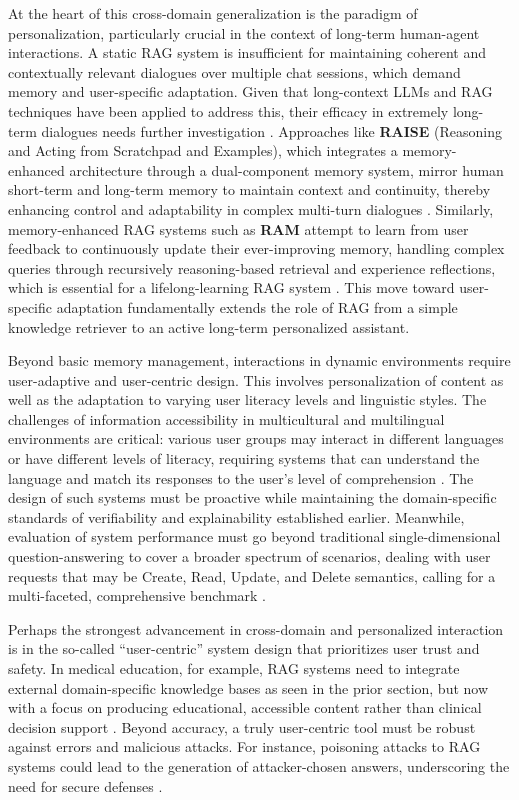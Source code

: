 \documentclass[11pt]{article}
\begin{document}
At the heart of this cross-domain generalization is the paradigm of personalization, particularly crucial in the context of long-term human-agent interactions. A static RAG system is insufficient for maintaining coherent and contextually relevant dialogues over multiple chat sessions, which demand memory and user-specific adaptation. Given that long-context LLMs and RAG techniques have been applied to address this, their efficacy in extremely long-term dialogues needs further investigation \cite{ref395}. Approaches like \textbf{RAISE} (Reasoning and Acting from Scratchpad and Examples), which integrates a memory-enhanced architecture through a dual-component memory system, mirror human short-term and long-term memory to maintain context and continuity, thereby enhancing control and adaptability in complex multi-turn dialogues \cite{ref396}. Similarly, memory-enhanced RAG systems such as \textbf{RAM} attempt to learn from user feedback to continuously update their ever-improving memory, handling complex queries through recursively reasoning-based retrieval and experience reflections, which is essential for a lifelong-learning RAG system \cite{ref397}. This move toward user-specific adaptation fundamentally extends the role of RAG from a simple knowledge retriever to an active long-term personalized assistant.

Beyond basic memory management, interactions in dynamic environments require user-adaptive and user-centric design. This involves personalization of content as well as the adaptation to varying user literacy levels and linguistic styles. The challenges of information accessibility in multicultural and multilingual environments are critical: various user groups may interact in different languages or have different levels of literacy, requiring systems that can understand the language and match its responses to the user's level of comprehension \cite{ref398}. The design of such systems must be proactive while maintaining the domain-specific standards of verifiability and explainability established earlier. Meanwhile, evaluation of system performance must go beyond traditional single-dimensional question-answering to cover a broader spectrum of scenarios, dealing with user requests that may be Create, Read, Update, and Delete semantics, calling for a multi-faceted, comprehensive benchmark \cite{ref399}.

Perhaps the strongest advancement in cross-domain and personalized interaction is in the so-called ``user-centric'' system design that prioritizes user trust and safety. In medical education, for example, RAG systems need to integrate external domain-specific knowledge bases as seen in the prior section, but now with a focus on producing educational, accessible content rather than clinical decision support \cite{ref400}. Beyond accuracy, a truly user-centric tool must be robust against errors and malicious attacks. For instance, poisoning attacks to RAG systems could lead to the generation of attacker-chosen answers, underscoring the need for secure defenses \cite{ref257}.
\end{document}
